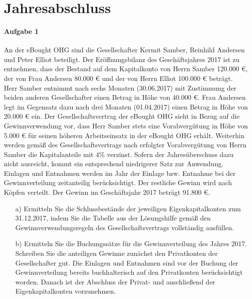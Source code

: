 \documentclass[paper=a4, fontsize=11pt]{scrartcl}
\numberwithin{equation}{section}
\numberwithin{figure}{section}
\numberwithin{table}{section}
\begin{document}
\section{Jahresabschluss}
\paragraph{Aufgabe 1}
An der eBought OHG sind die Gesellschafter Kermit Samber, Reinhild Andersen und Peter Elliot beteiligt. Der Eröffnungsbilanz des Geschäftsjahres 2017 ist zu entnehmen, dass der Bestand auf dem Kapitalkonto von Herrn Samber 120.000 €, der von Frau Andersen 80.000 € und der von Herrn Elliot 100.000 € beträgt. Herr Samber entnimmt nach sechs Monaten (30.06.2017) mit Zustimmung der beiden anderen Gesellschafter einen Betrag in Höhe von 40.000 €. Frau Andersen legt im Gegensatz dazu nach drei Monaten (01.04.2017) einen Betrag in Höhe von 20.000 € ein.  Der Gesellschaftsvertrag der eBought OHG sieht in Bezug auf die Gewinnverwendung vor, dass Herr Samber stets eine Vorabvergütung in Höhe von 5.000 € für seinen höheren Arbeitseinsatz in der eBought OHG erhält. Weiterhin werden gemäß des Gesellschaftsvertrags nach erfolgter Vorabvergütung von Herrn Samber die Kapitalanteile mit $4 \%$ verzinst. Sofern der Jahresüberschuss dazu nicht ausreicht, kommt ein entsprechend niedrigerer Satz zur Anwendung. Einlagen und Entnahmen werden im Jahr der Einlage bzw. Entnahme bei der Gewinnverteilung zeitanteilig berücksichtigt. Der restliche Gewinn wird nach Köpfen verteilt.  Der Gewinn im Geschäftsjahr 2017 beträgt 91.800 €. \\
\begin{itemize}
\item[a)] Ermitteln Sie die Schlussbestände der jeweiligen Eigenkapitalkonten zum 31.12.2017, indem Sie die Tabelle aus der Lösungshilfe gemäß den Gewinnverwendungsregeln des Gesellschaftsvertrags vollständig ausfüllen.
\item[b)] Ermitteln Sie die Buchungssätze für die Gewinnverteilung des Jahres 2017. Schreiben Sie die anteiligen Gewinne zunächst den Privatkonten der Gesellschafter gut. Die Einlagen und Entnahmen sind vor der Buchung der Gewinnverteilung bereits buchhalterisch auf den Privatkonten berücksichtigt worden. Danach ist der Abschluss der Privat- und anschließend der Eigenkapitalkonten vorzunehmen. 
\end{itemize}
\end{document}

